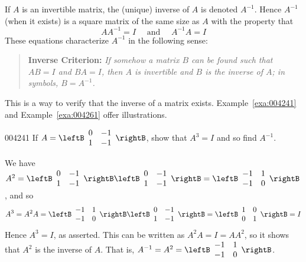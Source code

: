 If $A$ is an invertible matrix, the (unique) inverse of $A$ is denoted $A^{-1}$. Hence $A^{-1}$ (when it exists) is a square matrix of the same size as $A$ with the property that
\begin{equation*}
AA^{-1} = I \quad \mbox{ and } \quad A^{-1}A = I
\end{equation*}
These equations characterize $A^{-1}$ in the following sense: 

\begin{quotation}
\noindent\textbf{Inverse Criterion:} {\slshape If somehow a matrix $B$ can be found such that $AB = I$ and $BA = I$, then $A$ is invertible and $B$ is the inverse of $A$; in symbols, $B = A^{-1}$.}
\end{quotation}

\noindent This is a way to verify that the inverse of a matrix exists. Example~\ref{exa:004241} and Example~\ref{exa:004261} offer illustrations.


\begin{example}{}{004241}
If $A = \leftB \begin{array}{rr}
0 & -1 \\
1 & -1
\end{array} \rightB$, show that $A^{3} = I$ and so find $A^{-1}$.


\begin{solution}
  We have $A^{2} = \leftB \begin{array}{rr}
  0 & -1 \\
  1 & -1
  \end{array} \rightB \leftB \begin{array}{rr}
  0 & -1 \\
  1 & -1
  \end{array} \rightB = \leftB \begin{array}{rr}
  -1 & 1 \\
  -1 & 0
  \end{array} \rightB$, and so
\begin{equation*}
A^{3} = A^{2}A = \leftB \begin{array}{rr}
-1 & 1 \\
-1 & 0
\end{array} \rightB \leftB \begin{array}{rr}
0 & -1 \\
1 & -1
\end{array} \rightB = \leftB \begin{array}{rr}
1 & 0 \\
0 & 1
\end{array} \rightB = I
\end{equation*}
Hence $A^{3} = I$, as asserted. This can be written as $A^{2}A = I = AA^{2}$, so it shows that $A^{2}$ is the inverse of $A$. That is, $A^{-1} = A^{2} = \leftB \begin{array}{rr}
-1 & 1 \\
-1 & 0
\end{array} \rightB$.
\end{solution}
\end{example}


